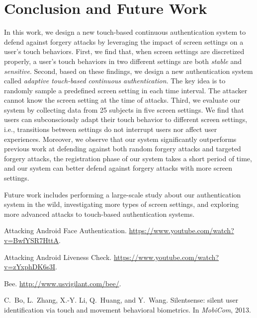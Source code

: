\documentclass{sig-alternate-05-2015}
\begin{document}
{\section{Conclusion and Future Work}\label{sec:conclusion}



In this work, we design a new touch-based continuous authentication system
 to defend against forgery attacks by leveraging the impact of screen 
settings on a user's touch behaviors.  First, we find that, when screen settings are discretized properly, a user's
touch behaviors in two different settings are both \emph{stable} and
\emph{sensitive}.  Second, based on these findings, we design a new authentication system called
\emph{adaptive touch-based continuous authentication}. The key idea is to randomly sample a predefined screen setting  in each time interval. The attacker cannot know the screen setting at the time of attacks. 
Third, we evaluate our system by collecting
data from 25 subjects in five screen settings. We find that  users can subconsciously 
adapt their touch behavior to different screen settings, 
i.e., transitions between settings do not interrupt users nor affect user experiences. 
 Moreover, we observe that our system
significantly outperforms previous work at defending against both random forgery
attacks and targeted forgery attacks, the registration phase of our system takes a short
period of time,  and our system can better defend  against forgery attacks with more 
screen settings.

Future work includes performing a large-scale study about our authentication system in the wild, investigating more types of screen settings,  and 
exploring more advanced attacks to touch-based authentication systems.

\balance
{

\begin{thebibliography}{10}

{Attacking Android Face Authentication}.
\newblock \url{https://www.youtube.com/watch?v=BwfYSR7HttA}.

{Attacking Android Liveness Check}.
\newblock \url{https://www.youtube.com/watch?v=zYxphDK6s3I}.

{Bee}.
\newblock \url{http://www.usvigilant.com/bee/}.

C.~Bo, L.~Zhang, X.-Y. Li, Q.~Huang, and Y.~Wang.
\newblock Silentsense: silent user identification via touch and movement
  behavioral biometrics.
\newblock In {\em MobiCom}, 2013.


\end{thebibliography}}}
\end{document}
